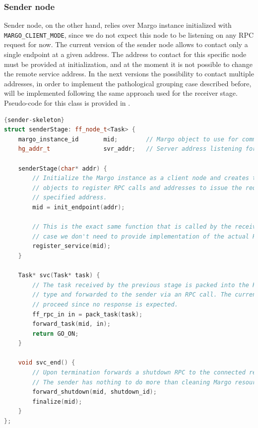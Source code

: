 \subsubsection{Sender node}
Sender node, on the other hand, relies over Margo instance initialized with \texttt{MARGO\_CLIENT\_MODE}, since we do not expect this node to be listening on any RPC request for now.  The current version of the sender node allows to contact only a single endpoint at a given address. The address to contact for this specific node must be provided at initialization, and at the moment it is not possible to change the remote service address. In the next versions the possibility to contact multiple addresses, in order to implement the pathological grouping case described before, will be implemented following the same approach used for the receiver stage. Pseudo-code for this class is provided in .

\begin{lstlisting}[language=C++, style=mystyle, caption={Sender node pseudo-code.}, label={sender-skeleton}]{sender-skeleton}
struct senderStage: ff_node_t<Task> {
    margo_instance_id       mid;        // Margo object to use for communications
    hg_addr_t               svr_addr;   // Server address listening for incoming RPCs

    senderStage(char* addr) {
        // Initialize the Margo instance as a client node and creates the necessary
        // objects to register RPC calls and addresses to issue the requests to the
        // specified address.
        mid = init_endpoint(addr);
        
        // This is the exact same function that is called by the receiver, but in this
        // case we don't need to provide implementation of the actual RPC function.
        register_service(mid);
    }

    Task* svc(Task* task) {
        // The task received by the previous stage is packed into the RPC registered
        // type and forwarded to the sender via an RPC call. The current node can
        // proceed since no response is expected.
        ff_rpc_in in = pack_task(task);
        forward_task(mid, in);
        return GO_ON;
    }

    void svc_end() {
        // Upon termination forwards a shutdown RPC to the connected receiver node.
        // The sender has nothing to do more than cleaning Margo resources. 
        forward_shutdown(mid, shutdown_id);
        finalize(mid);
    }
};
\end{lstlisting}


